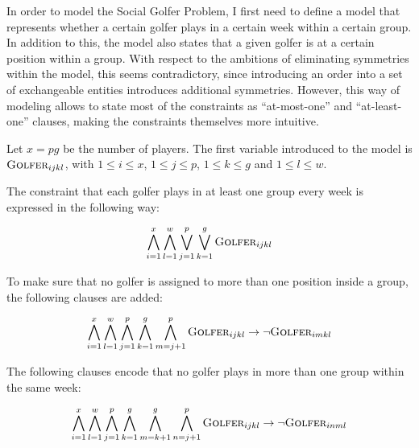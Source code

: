 \documentclass[a4paper]{scrartcl}
\begin{document}
In order to model the Social Golfer Problem, I first need to define a model that represents whether a certain golfer plays in a certain week within a certain group. In addition to this, the model also states that a given golfer is at a certain position within a group. With respect to the ambitions of eliminating symmetries within the model, this seems contradictory, since introducing an order into a set of exchangeable entities introduces additional symmetries. However, this way of modeling allows to state most of the constraints as ``at-most-one'' and ``at-least-one'' clauses, making the constraints themselves more intuitive.

Let $x = pg$ be the number of players. The first variable introduced to the model is $\textsc{Golfer}_{ijkl}$, with $1 \leq i \leq x$, $1 \leq j \leq p$, $1 \leq k \leq g$ and $1 \leq l \leq w$.

The constraint that each golfer plays in at least one group every week is expressed in the following way:

\begin{equation}
\label{form:everyone_plays}
\centering
    \bigwedge \limits_{i=1}^x 
    \bigwedge \limits_{l=1}^w 
    \bigvee \limits_{j=1}^p
    \bigvee \limits_{k=1}^g 
    \textsc{Golfer}_{ijkl}
\end{equation}

To make sure that no golfer is assigned to more than one position inside a group, the following clauses are added:

\begin{equation}
\centering
    \bigwedge \limits_{i=1}^x 
    \bigwedge \limits_{l=1}^w 
    \bigwedge \limits_{j=1}^p
    \bigwedge \limits_{k=1}^g 
    \bigwedge \limits_{m=j+1}^p 
    \textsc{Golfer}_{ijkl} 
    \to
    \neg \textsc{Golfer}_{imkl}
\end{equation}

The following clauses encode that no golfer plays in more than one group within the same week:

\begin{equation}
\centering
    \bigwedge \limits_{i=1}^x 
    \bigwedge \limits_{l=1}^w 
    \bigwedge \limits_{j=1}^p
    \bigwedge \limits_{k=1}^g 
    \bigwedge \limits_{m=k+1}^g 
    \bigwedge \limits_{n=j+1}^p 
    \textsc{Golfer}_{ijkl} 
    \to
    \neg \textsc{Golfer}_{inml}
\end{equation}
\end{document}
